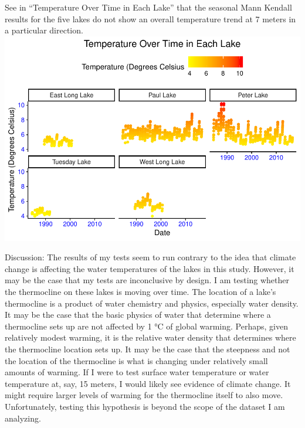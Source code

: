 \documentclass[12pt,]{article}
\begin{document}
See in ``Temperature Over Time in Each Lake'' that the seasonal Mann
Kendall results for the five lakes do not show an overall temperature
trend at 7 meters in a particular direction.
\includegraphics{Bollt_ENV872_FinalProject_files/figure-latex/smk temperature visualization-1.pdf}

Discussion: The results of my tests seem to run contrary to the idea
that climate change is affecting the water temperatures of the lakes in
this study. However, it may be the case that my tests are inconclusive
by design. I am testing whether the thermocline on these lakes is moving
over time. The location of a lake's thermocline is a product of water
chemistry and physics, especially water density. It may be the case that
the basic physics of water that determine where a thermocline sets up
are not affected by 1 °C of global warming. Perhaps, given relatively
modest warming, it is the relative water density that determines where
the thermocline location sets up. It may be the case that the steepness
and not the location of the thermocline is what is changing under
relatively small amounts of warming. If I were to test surface water
temperature or water temperature at, say, 15 meters, I would likely see
evidence of climate change. It might require larger levels of warming
for the thermocline itself to also move. Unfortunately, testing this
hypothesis is beyond the scope of the dataset I am analyzing.
\end{document}
